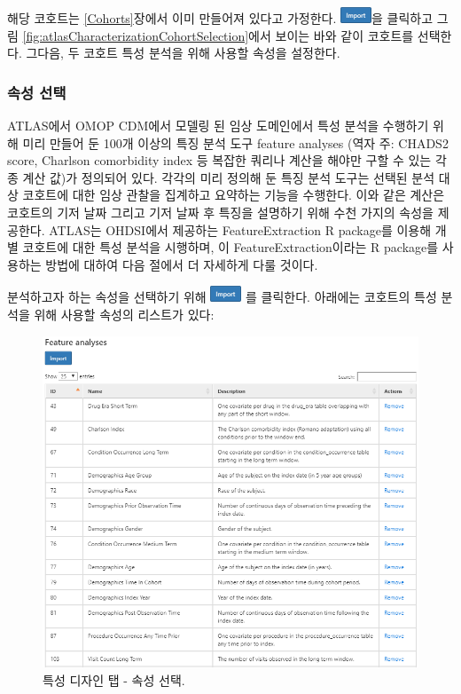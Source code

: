 \documentclass[10.5pt]{book}
\theoremstyle{definition}
\theoremstyle{definition}
\theoremstyle{definition}
\theoremstyle{remark}
\begin{document}
해당 코호트는 \ref{Cohorts}장에서 이미 만들어져 있다고 가정한다.
\includegraphics{images/Characterization/atlasImportButton.png}을
클릭하고 그림 \ref{fig:atlasCharacterizationCohortSelection}에서 보이는
바와 같이 코호트를 선택한다. 그다음, 두 코호트 특성 분석을 위해 사용할
속성을 설정한다.

\subsubsection*{속성 선택}\label{-}

ATLAS에서 OMOP CDM에서 모델링 된 임상 도메인에서 특성 분석을 수행하기
위해 미리 만들어 둔 100개 이상의 특징 분석 도구 feature analyses (역자
주: CHADS2 score, Charlson comorbidity index 등 복잡한 쿼리나 계산을
해야만 구할 수 있는 각종 계산 값)가 정의되어 있다. 각각의 미리 정의해 둔
특징 분석 도구는 선택된 분석 대상 코호트에 대한 임상 관찰을 집계하고
요약하는 기능을 수행한다. 이와 같은 계산은 코호트의 기저 날짜 그리고
기저 날짜 후 특징을 설명하기 위해 수천 가지의 속성을 제공한다. ATLAS는
OHDSI에서 제공하는 FeatureExtraction R package를 이용해 개별 코호트에
대한 특성 분석을 시행하며, 이 FeatureExtraction이라는 R package를
사용하는 방법에 대하여 다음 절에서 더 자세하게 다룰 것이다.

분석하고자 하는 속성을 선택하기 위해
\includegraphics{images/Characterization/atlasImportButton.png} 를
클릭한다. 아래에는 코호트의 특성 분석을 위해 사용할 속성의 리스트가
있다:

\begin{figure}

{\centering \includegraphics[width=1\linewidth]{images/Characterization/atlasCharacterizationFeatureSelection} 

}

\caption{특성 디자인 탭 - 속성 선택.}\label{fig:atlasCharacterizationFeatureSelection}
\end{figure}
\end{document}
